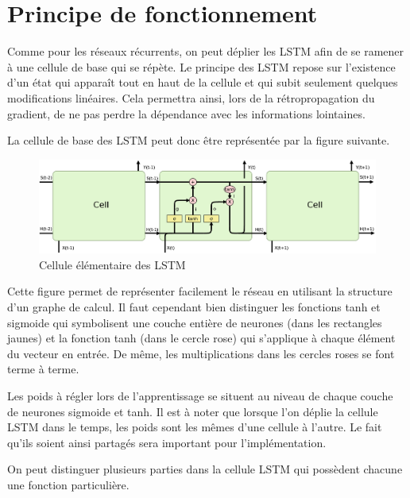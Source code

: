 \documentclass{report}
\theoremstyle{plain}
\theoremstyle{definition}
\theoremstyle{remark}
\begin{document}
\newpage

\section{Principe de fonctionnement}
Comme pour les réseaux récurrents, on peut déplier les LSTM afin de se ramener à une cellule de base qui se répète. Le principe des LSTM repose sur l'existence d'un état qui apparaît tout en haut de la cellule et qui subit seulement quelques modifications linéaires. Cela permettra ainsi, lors de la rétropropagation du gradient, de ne pas perdre la dépendance avec les informations lointaines.

La cellule de base des LSTM peut donc être représentée par la figure suivante.

\begin{figure}[h!]
\begin{center}
\includegraphics[scale=0.12]{images/LSTM_article_plusieurscell.png}
\caption{Cellule élémentaire des LSTM}
\label{cellule LSTM}
\end{center}
\end{figure}

Cette figure permet de représenter facilement le réseau en utilisant la structure d'un graphe de calcul. Il faut cependant bien distinguer les fonctions tanh et sigmoide qui symbolisent une couche entière de neurones (dans les rectangles jaunes) et la fonction tanh (dans le cercle rose) qui s'applique à chaque élément du vecteur en entrée. De même, les multiplications dans les cercles roses se font terme à terme.

Les poids à régler lors de l'apprentissage se situent au niveau de chaque couche de neurones sigmoide et tanh. Il est à noter que lorsque l'on déplie la cellule LSTM dans le temps, les poids sont les mêmes d'une cellule à l'autre. Le fait qu'ils soient ainsi partagés sera important pour l'implémentation.

On peut distinguer plusieurs parties dans la cellule LSTM qui possèdent chacune une fonction particulière.
\end{document}
